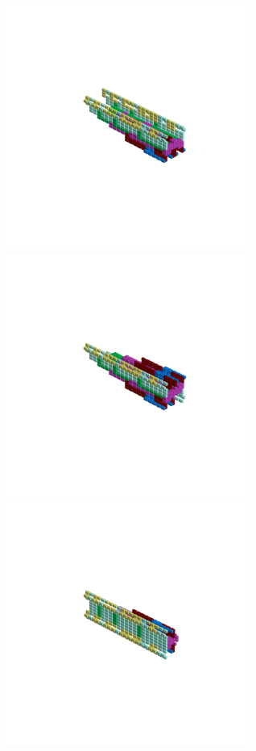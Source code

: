 \clearpage
\rhead[]{\leftmark}
\hspace{-1cm}
\begin{minipage}[b]{0.50\linewidth}                                       
  \begin{figure}[H]
      \centering
        \vspace*{-1cm}
        \hspace*{-2cm}
        \includegraphics[width=8cm]{src/symmetries/pattern2_1-45.png}%
        \hspace*{-4cm}
        \includegraphics[width=8cm]{src/symmetries/pattern2_2-45.png}\\
        \vspace*{-5cm}
        \hspace*{-3cm}
        \includegraphics[width=8cm]{src/symmetries/pattern2_3-45.png}\\

\end{figure}
\end{minipage}
